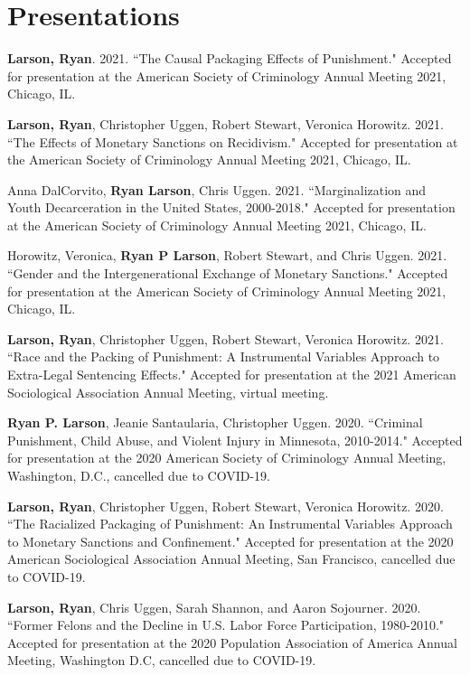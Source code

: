 \documentclass[letterpaper]{article}
\renewenvironment{itemize}{
  \begin{list}{}{
    \setlength{\leftmargin}{1.5em}
  }
}{
  \end{list}
}
\begin{document}
\section*{\textbf{Presentations}}
\begin{itemize}
\item \textbf{Larson, Ryan}. 2021. ``The Causal Packaging Effects of Punishment." Accepted for presentation at the American Society of Criminology Annual Meeting 2021, Chicago, IL. 
\item \textbf{Larson, Ryan}, Christopher Uggen, Robert Stewart, Veronica Horowitz. 2021. ``The Effects of Monetary Sanctions on Recidivism." Accepted for presentation at the American Society of Criminology Annual Meeting 2021, Chicago, IL. 
\item Anna DalCorvito, \textbf{Ryan Larson}, Chris Uggen. 2021. ``Marginalization and Youth Decarceration in the United States, 2000-2018." Accepted for presentation at the American Society of Criminology Annual Meeting 2021, Chicago, IL. 
\item Horowitz, Veronica, \textbf{Ryan P Larson}, Robert Stewart, and Chris Uggen. 2021. ``Gender and the Intergenerational Exchange of Monetary Sanctions." Accepted for presentation at the American Society of Criminology Annual Meeting 2021, Chicago, IL. 
\item \textbf{Larson, Ryan}, Christopher Uggen, Robert Stewart, Veronica Horowitz. 2021. ``Race and the Packing of Punishment: A Instrumental Variables Approach to Extra-Legal Sentencing Effects." Accepted for presentation at the 2021 American Sociological Association Annual Meeting, virtual meeting. 
\item \textbf{Ryan P. Larson}, Jeanie Santaularia, Christopher Uggen. 2020. ``Criminal Punishment, Child Abuse, and Violent Injury in Minnesota, 2010-2014." Accepted for presentation at the 2020 American Society of Criminology Annual Meeting, Washington, D.C., cancelled due to COVID-19.  
\item \textbf{Larson, Ryan}, Christopher Uggen, Robert Stewart, Veronica Horowitz. 2020. ``The Racialized Packaging of Punishment: An Instrumental Variables Approach to Monetary Sanctions and Confinement." Accepted for presentation at the 2020 American Sociological Association Annual Meeting, San Francisco, cancelled due to COVID-19. 
\item \textbf{Larson, Ryan}, Chris Uggen, Sarah Shannon, and Aaron Sojourner. 2020. ``Former Felons and the Decline in U.S. Labor Force Participation, 1980-2010." Accepted for presentation at the 2020 Population Association of America Annual Meeting, Washington D.C, cancelled due to COVID-19. 

\end{itemize}
\end{document}
